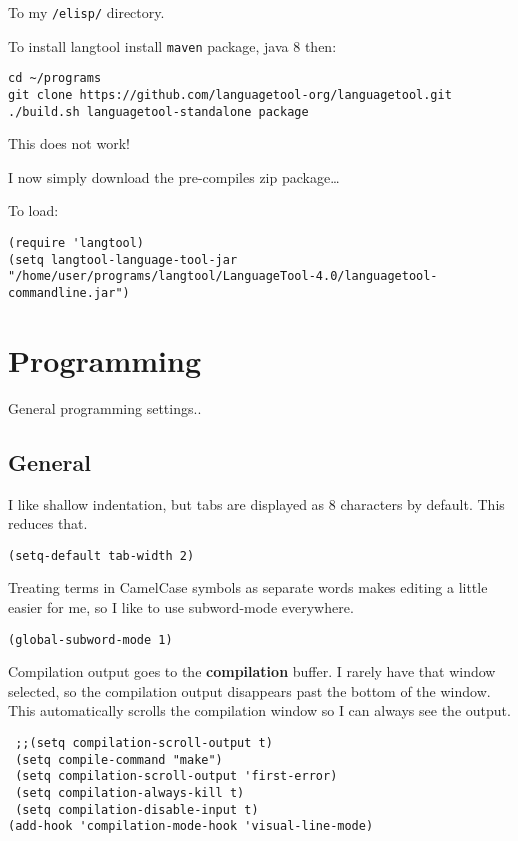 \documentclass[12pt]{article}
\begin{document}
To my \texttt{/elisp/} directory. 

To install langtool install \texttt{maven} package, java 8 then:

\begin{verbatim}
cd ~/programs
git clone https://github.com/languagetool-org/languagetool.git
./build.sh languagetool-standalone package
\end{verbatim}
This does not work! 

I now simply download the pre-compiles zip package\ldots{} 

To load: 
\lstset{language=Lisp,label= ,caption= ,numbers=none}
\begin{lstlisting}
(require 'langtool)
(setq langtool-language-tool-jar "/home/user/programs/langtool/LanguageTool-4.0/languagetool-commandline.jar")
\end{lstlisting}

\section{Programming}
\label{sec-7}

General programming settings..

\subsection{General}
\label{sec-7-1}

I like shallow indentation, but tabs are displayed as 8 characters by default. This reduces that.

\lstset{language=Lisp,label= ,caption= ,numbers=none}
\begin{lstlisting}
(setq-default tab-width 2)
\end{lstlisting}

Treating terms in CamelCase symbols as separate words makes editing a little
easier for me, so I like to use subword-mode everywhere.
\lstset{language=Lisp,label= ,caption= ,numbers=none}
\begin{lstlisting}
(global-subword-mode 1)
\end{lstlisting}

Compilation output goes to the \textbf{compilation} buffer. I rarely have that window
selected, so the compilation output disappears past the bottom of the window.
This automatically scrolls the compilation window so I can always see the
output.

\lstset{language=Lisp,label= ,caption= ,numbers=none}
\begin{lstlisting}
 ;;(setq compilation-scroll-output t)
 (setq compile-command "make")
 (setq compilation-scroll-output 'first-error)
 (setq compilation-always-kill t)
 (setq compilation-disable-input t)
(add-hook 'compilation-mode-hook 'visual-line-mode)
\end{lstlisting}
\end{document}
